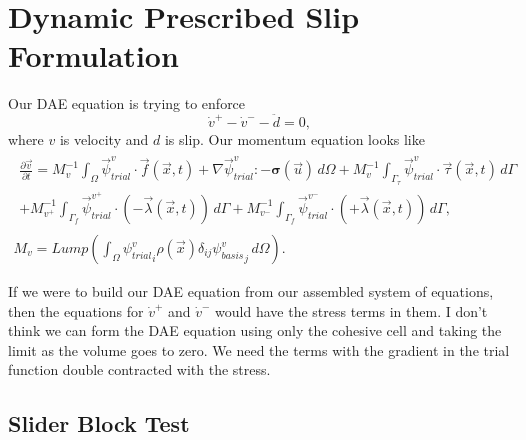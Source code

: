 \documentclass{article}
\newcommand{\trialvec}[1][]{{\vec{\psi}_\mathit{trial}^{#1}}}
\newcommand{\trialscalar}[1][]{{\psi_\mathit{trial}^{#1}}}
\newcommand{\basisscalar}[1][]{{\psi_\mathit{basis}^{#1}}}
\newcommand{\tensor}[1]{\bm{#1}}
\begin{document}
\section{Dynamic Prescribed Slip Formulation}

Our DAE equation is trying to enforce
\begin{equation}
  \dot{v}^+ - \dot{v}^- - \ddot{d} = 0,
\end{equation}
where $v$ is velocity and $d$ is slip.
Our momentum equation looks like
\begin{gather}
  \begin{multlined}
  \frac{\partial \vec{v}}{\partial t}
  = M_v^{-1} \int_\Omega \trialvec[v] \cdot \vec{f}(\vec{x},t) + \nabla \trialvec[v] : -\tensor{\sigma}(\vec{u}) \, d\Omega
  + M_v^{-1} \int_{\Gamma_\tau} \trialvec[v] \cdot \vec{\tau}(\vec{x},t) \, d\Gamma \\
  + M_{v^+}^{-1} \int_{\Gamma_{f}} \trialvec[v^+] \cdot \left(-\vec{\lambda}(\vec{x},t)\right) \, d\Gamma
  + M_{v^-}^{-1} \int_{\Gamma_{f}}\trialvec[v^-] \cdot \left(+\vec{\lambda}(\vec{x},t)\right) \, d\Gamma,
\end{multlined}\\
M_v = \mathit{Lump}\left( \int_\Omega \trialscalar[v]_i \rho(\vec{x}) \delta_{ij} \basisscalar[v]_j \, d\Omega \right).
\end{gather}

If we were to build our DAE equation from our assembled system of equations, then the equations for $\dot{v}^+$ and $\dot{v}^-$ would have the stress terms in them.
I don't think we can form the DAE equation using only the cohesive cell and taking the limit as the volume goes to zero.
We need the terms with the gradient in the trial function double contracted with the stress.

\subsection{Slider Block Test}
\end{document}
